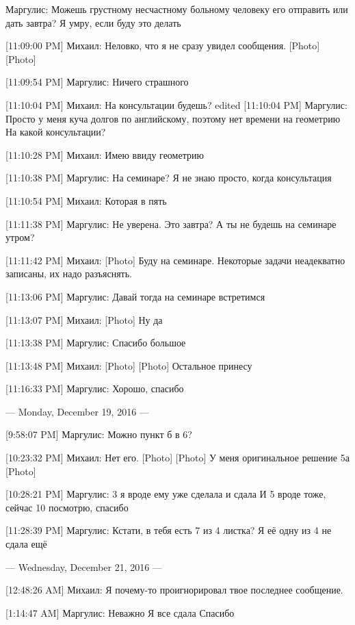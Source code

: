 \documentclass{article}
\begin{document}
\title{}
\author{}
\date{}
\maketitle

Маргулис:
Можешь грустному несчастному больному человеку его отправить или дать завтра? Я умру, если буду это делать

[11:09:00 PM] Михаил:
Неловко, что я не сразу увидел сообщения.
 [Photo]
 [Photo]

[11:09:54 PM] Маргулис:
Ничего страшного

[11:10:04 PM] Михаил:
На консультации будешь?
edited 
[11:10:04 PM] Маргулис:
Просто у меня куча долгов по английскому, поэтому нет времени на геометрию
 На какой консультации?

[11:10:28 PM] Михаил:
Имею ввиду геометрию

[11:10:38 PM] Маргулис:
На семинаре?
 Я не знаю просто, когда консультация

[11:10:54 PM] Михаил:
Которая в пять

[11:11:38 PM] Маргулис:
Не уверена. Это завтра? А ты не будешь на семинаре утром?

[11:11:42 PM] Михаил:
[Photo]
 Буду на семинаре. Некоторые задачи неадекватно записаны, их надо разъяснять.

[11:13:06 PM] Маргулис:
Давай тогда на семинаре встретимся

[11:13:07 PM] Михаил:
[Photo]
 Ну да

[11:13:38 PM] Маргулис:
Спасибо большое

[11:13:48 PM] Михаил:
[Photo]
 [Photo]
 Остальное принесу

[11:16:33 PM] Маргулис:
Хорошо, спасибо

--- Monday, December 19, 2016 ---

[9:58:07 PM] Маргулис:
Можно пункт б в 6?

[10:23:32 PM] Михаил:
Нет его.
 [Photo]
 [Photo]
 У меня оригинальное решение 5а
 [Photo]

[10:28:21 PM] Маргулис:
3 я вроде ему уже сделала и сдала
 И 5 вроде тоже, сейчас 10 посмотрю, спасибо

[11:28:39 PM] Маргулис:
Кстати, в тебя есть 7 из 4 листка? Я её одну из 4 не сдала ещё

--- Wednesday, December 21, 2016 ---

[12:48:26 AM] Михаил:
Я почему-то проигнорировал твое последнее сообщение.

[1:14:47 AM] Маргулис:
Неважно
 Я все сдала
 Спасибо
\end{document}
